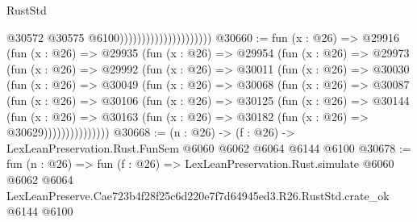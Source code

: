 \begin{lexlean}{RustStd}
\begin{coremodule}
                                              @30572
                                              @30575
                                              @6100)))))))))))))))))))))
@30660 := fun (x : @26) =>
  @29916
    (fun (x : @26) =>
    @29935
      (fun (x : @26) =>
      @29954
        (fun (x : @26) =>
        @29973
          (fun (x : @26) =>
          @29992
            (fun (x : @26) =>
            @30011
              (fun (x : @26) =>
              @30030
                (fun (x : @26) =>
                @30049
                  (fun (x : @26) =>
                  @30068
                    (fun (x : @26) =>
                    @30087
                      (fun (x : @26) =>
                      @30106
                        (fun (x : @26) =>
                        @30125
                          (fun (x : @26) =>
                          @30144
                            (fun (x : @26) =>
                            @30163 (fun (x : @26) => @30182 (fun (x : @26) => @30629)))))))))))))))
@30668 := (n : @26) -> (f : @26) -> LexLeanPreservation.Rust.FunSem @6060 @6062 @6064 @6144 @6100
@30678 := fun (n : @26) =>
  fun (f : @26) =>
  LexLeanPreservation.Rust.simulate
    @6060
    @6062
    @6064
    LexLeanPreserve.Cae723b4f28f25c6d220e7f7d64945ed3.R26.RustStd.crate_ok
    @6144
    @6100
\end{coremodule}
\end{lexlean}
